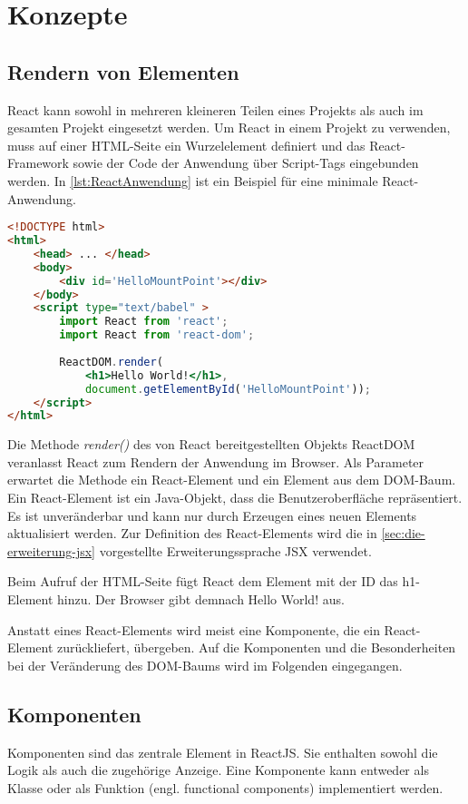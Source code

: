 \section{Konzepte}

\subsection{Rendern von Elementen}
React kann sowohl in mehreren kleineren Teilen eines Projekts als auch im gesamten Projekt eingesetzt werden. Um React in einem Projekt zu verwenden, muss auf einer HTML-Seite ein Wurzelelement definiert und das React-Framework sowie der Code der Anwendung über Script-Tags eingebunden werden. In \autoref{lst:ReactAnwendung} ist ein Beispiel für eine minimale React-Anwendung. 

\begin{lstlisting}[caption=Beispiel einer minimalen React-Anwendung , label=lst:ReactAnwendung, language=HTML]
<!DOCTYPE html>
<html>
	<head> ... </head>
	<body>
		<div id='HelloMountPoint'></div>
	</body>
	<script type="text/babel" >
		import React from 'react';
		import React from 'react-dom';
		
		ReactDOM.render(
			<h1>Hello World!</h1>, 
			document.getElementById('HelloMountPoint'));
	</script>
</html>
\end{lstlisting}

Die Methode \textit{render()} des von React bereitgestellten Objekts ReactDOM veranlasst React zum Rendern der Anwendung im Browser. Als Parameter erwartet die Methode ein React-Element und ein Element aus dem DOM-Baum. Ein React-Element ist ein Java-Objekt, dass die Benutzeroberfläche repräsentiert. Es ist unveränderbar und kann nur durch Erzeugen eines neuen Elements aktualisiert werden. Zur Definition des React-Elements wird die in \autoref{sec:die-erweiterung-jsx} vorgestellte Erweiterungssprache JSX verwendet.

Beim Aufruf der HTML-Seite fügt React dem Element mit der ID \glqq {} das h1-Element hinzu. Der Browser gibt demnach \glqq Hello World!\grqq{} aus. \autocites[vgl.][4\psqq, 26\psqq]{Zeigermann.2016}[vgl.][]{Facebook.2018}[vgl.][]{Facebook.2018c}[vgl.][2\psqq]{Stefanov.2017}

Anstatt eines React-Elements wird meist eine Komponente, die ein React-Element zurückliefert, übergeben. Auf die Komponenten und die Besonderheiten bei der Veränderung des DOM-Baums wird im Folgenden eingegangen.

\subsection{Komponenten}
Komponenten sind das zentrale Element in ReactJS. Sie enthalten sowohl die Logik als auch die zugehörige Anzeige. Eine Komponente kann entweder als Klasse oder als Funktion (engl. functional components) implementiert werden. 

